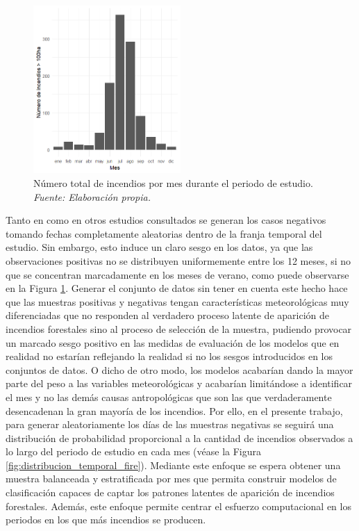 \documentclass[12pt,a4paper,]{book}
\numberwithin{dummy}{section}
\theoremstyle{ocrenumbox}
\theoremstyle{blacknumex}
\theoremstyle{blacknumbox}
\theoremstyle{ocrenum}
\theoremstyle{ocrenum}
\begin{document}
\begin{figure}[htb]
\centering
\includegraphics[width=0.5\textwidth]{graficos/incendios_mes.png}
\caption[Número total de incendios por mes durante el periodo de estudio]{Número total de incendios por mes durante el periodo de estudio. \it Fuente: Elaboración propia.}
\label{fig:incendios_mes}
\end{figure}

Tanto en \citet{stojanova2012estimating} como en otros estudios
consultados se generan los casos negativos tomando fechas completamente
aleatorias dentro de la franja temporal del estudio. Sin embargo, esto
induce un claro sesgo en los datos, ya que las observaciones positivas
no se distribuyen uniformemente entre los 12 meses, si no que se
concentran marcadamente en los meses de verano, como puede observarse en
la Figura \ref{fig:incendios_mes}. Generar el conjunto de datos sin
tener en cuenta este hecho hace que las muestras positivas y negativas
tengan características meteorológicas muy diferenciadas que no responden
al verdadero proceso latente de aparición de incendios forestales sino
al proceso de selección de la muestra, pudiendo provocar un marcado
sesgo positivo en las medidas de evaluación de los modelos que en
realidad no estarían reflejando la realidad si no los sesgos
introducidos en los conjuntos de datos. O dicho de otro modo, los
modelos acabarían dando la mayor parte del peso a las variables
meteorológicas y acabarían limitándose a identificar el mes y no las
demás causas antropológicas que son las que verdaderamente desencadenan
la gran mayoría de los incendios. Por ello, en el presente trabajo, para
generar aleatoriamente los días de las muestras negativas se seguirá una
distribución de probabilidad proporcional a la cantidad de incendios
observados a lo largo del periodo de estudio en cada mes (véase la
Figura \ref{fig:distribucion_temporal_fire}). Mediante este enfoque se
espera obtener una muestra balanceada y estratificada por mes que
permita construir modelos de clasificación capaces de captar los
patrones latentes de aparición de incendios forestales. Además, este
enfoque permite centrar el esfuerzo computacional en los periodos en los
que más incendios se producen.
\end{document}
